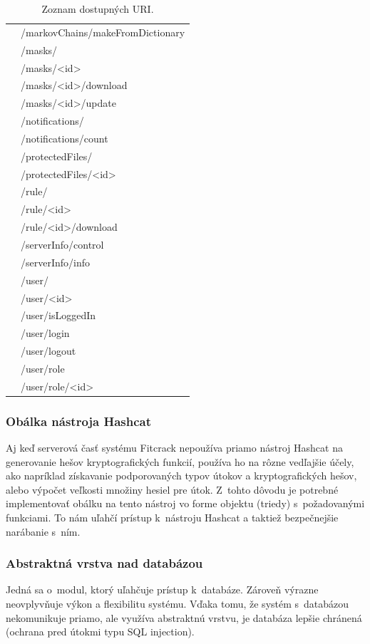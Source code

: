 \documentclass[slovak]{fitthesis}
\begin{document}
\begin{table}[h]
\begin{center}
\begin{tabular}{ |p{8cm}|p{7.4cm}|  }
           & /markovChains/makeFromDictionary \\
           & /masks/ \\
           & /masks/<id> \\
           & /masks/<id>/download \\
           & /masks/<id>/update \\
           & /notifications/ \\
           & /notifications/count \\
           & /protectedFiles/ \\
           & /protectedFiles/<id> \\
           & /rule/ \\
           & /rule/<id> \\
           & /rule/<id>/download \\
           & /serverInfo/control \\
           & /serverInfo/info \\
           & /user/ \\
           & /user/<id> \\
           & /user/isLoggedIn \\
           & /user/login \\
           & /user/logout \\
           & /user/role \\
           & /user/role/<id> \\
         \hline
        \end{tabular}
      \caption{Zoznam dostupných URI.}
      \label{zoznamURItable}
  \end{center}
\end{table}

\subsubsection{Obálka nástroja Hashcat}
Aj keď serverová časť systému Fitcrack nepoužíva priamo nástroj Hashcat na generovanie hešov kryptografických funkcií, používa ho na rôzne vedľajšie účely, ako napríklad získavanie podporovaných typov útokov a kryptografických hešov, alebo výpočet veľkosti množiny hesiel pre útok. Z~tohto dôvodu je potrebné implementovať obálku na tento nástroj vo forme objektu (triedy) s~požadovanými funkciami. To nám uľahčí prístup k~nástroju Hashcat a taktiež bezpečnejšie narábanie s~ním.

\subsubsection{Abstraktná vrstva nad databázou}
Jedná sa o~modul, ktorý uľahčuje prístup k~databáze. Zároveň výrazne neovplyvňuje výkon a flexibilitu systému. Vďaka tomu, že systém s~databázou nekomunikuje priamo, ale využíva abstraktnú vrstvu, je databáza lepšie chránená (ochrana pred útokmi typu SQL injection).
\end{document}
